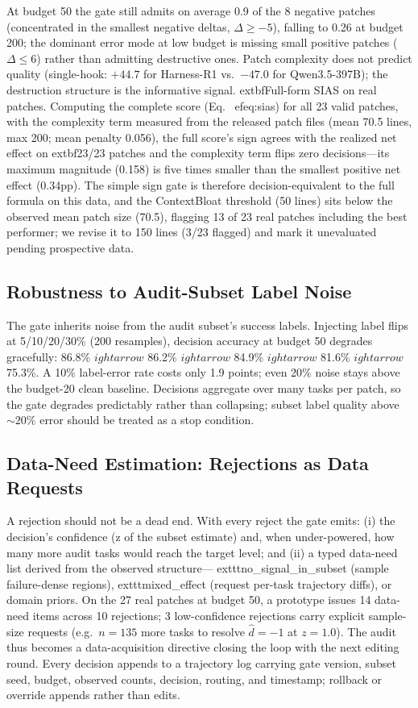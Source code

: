\documentclass{article}
\begin{document}
At budget 50 the gate still admits on average 0.9 of the 8 negative patches (concentrated in the smallest negative deltas, $\Delta \geq -5$), falling to 0.26 at budget 200; the dominant error mode at low budget is missing small positive patches ($\Delta \leq 6$) rather than admitting destructive ones. Patch complexity does not predict quality (single-hook: $+44.7$ for Harness-R1 vs.\ $-47.0$ for Qwen3.5-397B); the destruction structure is the informative signal. 	extbf{Full-form SIAS on real patches.} Computing the complete score (Eq.~
ef{eq:sias}) for all 23 valid patches, with the complexity term measured from the released patch files (mean 70.5 lines, max 200; mean penalty 0.056), the full score's sign agrees with the realized net effect on 	extbf{23/23} patches and the complexity term flips zero decisions---its maximum magnitude (0.158) is five times smaller than the smallest positive net effect (0.34pp). The simple sign gate is therefore decision-equivalent to the full formula on this data, and the ContextBloat threshold (50 lines) sits below the observed mean patch size (70.5), flagging 13 of 23 real patches including the best performer; we revise it to 150 lines (3/23 flagged) and mark it unevaluated pending prospective data.

\subsection{Robustness to Audit-Subset Label Noise}
The gate inherits noise from the audit subset's success labels. Injecting label flips at 5/10/20/30\% (200 resamples), decision accuracy at budget 50 degrades gracefully: 86.8\% $
ightarrow$ 86.2\% $
ightarrow$ 84.9\% $
ightarrow$ 81.6\% $
ightarrow$ 75.3\%. A 10\% label-error rate costs only 1.9 points; even 20\% noise stays above the budget-20 clean baseline. Decisions aggregate over many tasks per patch, so the gate degrades predictably rather than collapsing; subset label quality above ${\sim}20\%$ error should be treated as a stop condition.

\subsection{Data-Need Estimation: Rejections as Data Requests}
A rejection should not be a dead end. With every reject the gate emits: (i) the decision's confidence (z of the subset estimate) and, when under-powered, how many more audit tasks would reach the target level; and (ii) a typed data-need list derived from the observed structure---	exttt{no\_signal\_in\_subset} (sample failure-dense regions), 	exttt{mixed\_effect} (request per-task trajectory diffs), or domain priors. On the 27 real patches at budget 50, a prototype issues 14 data-need items across 10 rejections; 3 low-confidence rejections carry explicit sample-size requests (e.g.\ $n{=}135$ more tasks to resolve $\hat{d}{=}-1$ at $z{=}1.0$). The audit thus becomes a data-acquisition directive closing the loop with the next editing round. Every decision appends to a trajectory log carrying gate version, subset seed, budget, observed counts, decision, routing, and timestamp; rollback or override appends rather than edits.
\end{document}
